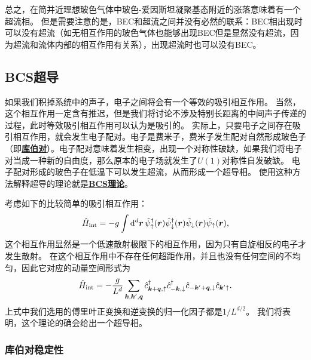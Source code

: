 \documentclass[hyperref, UTF8, a4paper]{ctexart}
\newcommand{\concept}[1]{\underline{\textbf{#1}}}
\begin{document}
总之，在简并近理想玻色气体中玻色-爱因斯坦凝聚基态附近的涨落意味着有一个超流相。
但是需要注意的是，BEC和超流之间并没有必然的联系：BEC相出现时可以没有超流（如无相互作用的玻色气体也能够出现BEC但是显然没有超流，因为超流和流体内部的相互作用有关系），出现超流时也可以没有BEC。

\subsection{BCS超导}

如果我们积掉系统中的声子，电子之间将会有一个等效的吸引相互作用。
当然，这个相互作用一定含有推迟，但是我们将讨论不涉及特别长距离的中间声子传递的过程，此时等效吸引相互作用可以认为是吸引的。
实际上，只要电子之间存在吸引相互作用，就会发生电子配对。电子是费米子，费米子发生配对自然形成玻色子（即\concept{库伯对}）。电子配对意味着发生相变，出现一个对称性破缺，如果我们将电子对当成一种新的自由度，那么原本的电子场就发生了$U(1)$对称性自发破缺。
电子配对形成的玻色子在低温下可以发生超流，从而形成一个超导相。
使用这种方法解释超导的理论就是\concept{BCS理论}。

考虑如下的比较简单的吸引相互作用：
\begin{equation}
    \hat{H}_\text{int} = - g \int \dd[d]{\vb*{r}} \hat{\psi}^\dagger_\uparrow(\vb*{r}) \hat{\psi}^\dagger_{\downarrow}(\vb*{r}) \hat{\psi}_{\downarrow}(\vb*{r}) \hat{\psi}_\uparrow(\vb*{r}),
\end{equation}
这个相互作用显然是一个低速散射极限下的相互作用，因为只有自旋相反的电子才发生散射。
在这个相互作用中不存在任何超距作用，并且也没有任何空间的不均匀，因此它对应的动量空间形式为
\begin{equation}
    \hat{H}_\text{int} = - \frac{g}{L^d} \sum_{\vb*{k}, \vb*{k}', \vb*{q}} \hat{c}^\dagger_{\vb*{k}+\vb*{q}, \uparrow} \hat{c}^\dagger_{-\vb*{k}, \downarrow} \hat{c}_{-\vb*{k}'+\vb*{q}, \downarrow} \hat{c}_{\vb*{k}' \uparrow}.
    \label{eq:bcs-hamiltonian-p}
\end{equation}
上式中我们选用的傅里叶正变换和逆变换的归一化因子都是$1/L^{d/2}$。
我们将表明，这个理论的确会给出一个超导相。

\subsubsection{库伯对稳定性}
\end{document}
